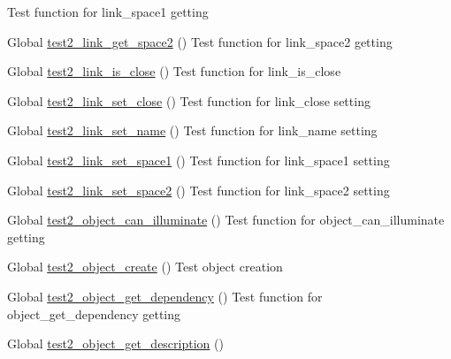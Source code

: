 \begin{DoxyRefList}
%
Test function for link\+\_\+space1 getting  
\item[Global \mbox{\hyperlink{link__test_8c_a338cec1ed0014445c228198bc6807daa}{test2\+\_\+link\+\_\+get\+\_\+space2}} ()]\label{test__test000093}%
%
Test function for link\+\_\+space2 getting  
\item[Global \mbox{\hyperlink{link__test_8c_a9c3031fd1173132b4facaedb3f8e77a6}{test2\+\_\+link\+\_\+is\+\_\+close}} ()]\label{test__test000095}%
%
Test function for link\+\_\+is\+\_\+close  
\item[Global \mbox{\hyperlink{link__test_8c_aba7dc447d7188fe8d9cd06d8bfbd6203}{test2\+\_\+link\+\_\+set\+\_\+close}} ()]\label{test__test000085}%
%
Test function for link\+\_\+close setting  
\item[Global \mbox{\hyperlink{link__test_8c_aa66c1e991620a5a758ba6e4d6b4a8b73}{test2\+\_\+link\+\_\+set\+\_\+name}} ()]\label{test__test000076}%
%
Test function for link\+\_\+name setting  
\item[Global \mbox{\hyperlink{link__test_8c_a82e395ee3f20a612351e2a36a6c21913}{test2\+\_\+link\+\_\+set\+\_\+space1}} ()]\label{test__test000079}%
%
Test function for link\+\_\+space1 setting  
\item[Global \mbox{\hyperlink{link__test_8c_a8d5608a414ed6987f6947437c8a1273e}{test2\+\_\+link\+\_\+set\+\_\+space2}} ()]\label{test__test000082}%
%
Test function for link\+\_\+space2 setting  
\item[Global \mbox{\hyperlink{object__test_8h_ab58c97300eb9a9fc22f188aece735254}{test2\+\_\+object\+\_\+can\+\_\+illuminate}} ()]\label{test__test000117}%
%
Test function for object\+\_\+can\+\_\+illuminate getting  
\item[Global \mbox{\hyperlink{object__test_8h_add54ab5e33a1b0a93e9ddcf73591bd9f}{test2\+\_\+object\+\_\+create}} ()]\label{test__test000097}%
%
Test object creation  
\item[Global \mbox{\hyperlink{object__test_8h_af8746713a9b762b1295bb1c4186260b8}{test2\+\_\+object\+\_\+get\+\_\+dependency}} ()]\label{test__test000125}%
%
Test function for object\+\_\+get\+\_\+dependency getting  
\item[Global \mbox{\hyperlink{object__test_8h_a35d9a40796133791c157c044ea1cef85}{test2\+\_\+object\+\_\+get\+\_\+description}} ()]\label{test__test000109}%

\end{DoxyRefList}

